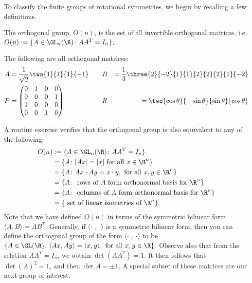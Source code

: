 To classify the finite groups of rotational symmetries, we begin by recalling a few definitions.

\begin{dfn}
The orthogonal group, $O(n)$, is the set of all invertible orthogonal matrices, i.e. $O(n):= \{ A \in \GL_n(\R) \colon AA^T= I_n\}$.
\end{dfn}


\begin{ex}
The following are all orthogonal matrices:
	\[
	\begin{aligned}
	A&= \dfrac{1}{\sqrt{2}} \two{1}{1}{1}{-1} && && B&= \dfrac{1}{3} \three{2}{-2}{1}{1}{2}{2}{2}{1}{-2} \\
	P&= \begin{pmatrix} 0 & 1 & 0 & 0 \\ 0 & 0 & 0 & 1 \\ 1 & 0 & 0 & 0 \\ 0 & 0 & 1 & 0 \end{pmatrix} && && R&= \two{\cos\theta}{-\sin\theta}{\sin\theta}{\cos\theta}
	\end{aligned}
	\] \xqed
\end{ex}

A routine exercise verifies that the orthogonal group is also equivalent to any of the following:
	\[
	\begin{split}
	O(n)&:= \{ A \in \GL_n(\R) \colon AA^T= I_n\} \\
	&=\{ A \colon |Ax|=|x| \text{ for all }x \in \R^n\} \\
	&= \{A \colon Ax \cdot Ay = x \cdot y, \text{ for all }x,y \in \R^n\} \\
	&= \{ A \colon \text{ rows of }A\text{ form orthonormal basis for }\R^n\} \\
	&= \{ A \colon \text{ columns of }A\text{ form orthonormal basis for }\R^n\} \\
	&=\{ \text{ set of linear isometries of }\R^n\}.
	\end{split}
	\]
Note that we have defined $O(n)$ in terms of the symmetric bilinear form $\langle A, B \rangle = AB^T$. Generally, if $\langle \cdot\;,\; \cdot \rangle$ is a symmetric bilinear form, then you can define the orthogonal group of the form $\langle \cdot\;,\; \cdot \rangle$ to be $\{ A \in \GL(\R) \colon \langle Ax , Ay \rangle=\langle x, y \rangle, \text{ for all }x,y \in \R\}$. Observe also that from the relation $AA^T=I_n$, we obtain $\det(AA^T)=1$. It then follows that $\det(A)^2=1$, and then $\det A = \pm 1$.  A special subset of these matrices are our next group of interest. 


